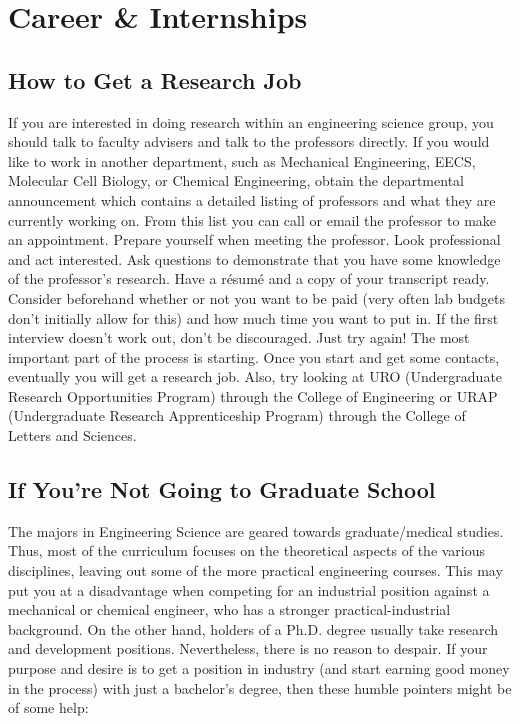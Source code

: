 \chapter*{Career \& Internships}

\section*{How to Get a Research Job}

If you are interested in doing research within an engineering science group, you should talk to faculty advisers and talk to the professors directly. If you would like to work in another department, such as Mechanical Engineering, EECS, Molecular Cell Biology, or Chemical Engineering, obtain the departmental announcement which contains a detailed listing of professors and what they are currently working on. From this list you can call or email the professor to make an appointment. Prepare yourself when meeting the professor. Look professional and act interested. Ask questions to demonstrate that you have some knowledge of the professor’s research. Have a r\'{e}sum\'{e} and a copy of your transcript ready. Consider beforehand whether or not you want to be paid (very often lab budgets don’t initially allow for this) and how much time you want to put in. If the first interview doesn’t work out, don’t be discouraged. Just try again! The most important part of the process is starting. Once you start and get some contacts, eventually you will get a research job. Also, try looking at URO (Undergraduate Research Opportunities Program) through the College of Engineering or URAP (Undergraduate Research Apprenticeship Program) through the College of Letters and Sciences.

\section*{If You’re Not Going to Graduate School}

The majors in Engineering Science are geared towards graduate/medical studies. Thus, most of the curriculum focuses on the theoretical aspects of the various disciplines, leaving out some of the more practical engineering courses. This may put you at a disadvantage when competing for an industrial position against a mechanical or chemical engineer, who has a stronger practical-industrial background. On the other hand, holders of a Ph.D. degree usually take research and development positions. Nevertheless, there is no reason to despair. If your purpose and desire is to get a position in industry (and start earning good money in the process) with just a bachelor’s degree, then these humble pointers might be of some help:

